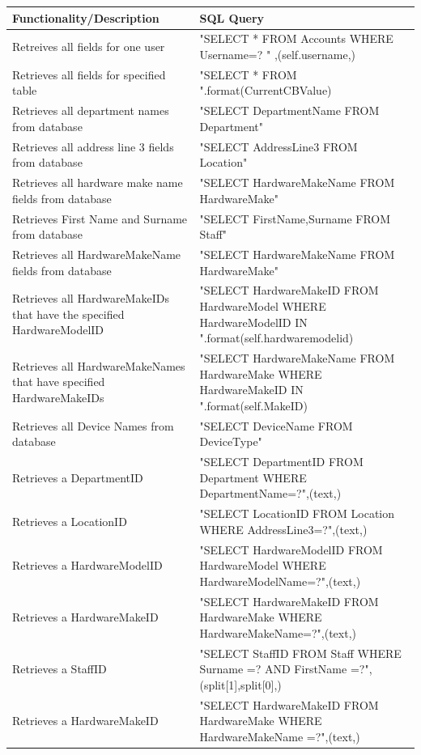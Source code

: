\begin{center}
    \begin{longtable}{|p{5cm}|p{7cm}|}
    \hline
	\textbf{Functionality/Description} & \textbf{SQL Query} \\ \hline

Retreives all fields for one user & "SELECT * FROM Accounts WHERE Username=? " ,(self.username,)\\ \hline
Retrieves all fields for specified table & "SELECT * FROM {}".format(CurrentCBValue) \\ \hline
Retrieves all department names from database & "SELECT DepartmentName FROM Department" \\ \hline
Retrieves all address line 3 fields from database & "SELECT AddressLine3 FROM Location" \\ \hline
Retrieves all hardware make name fields  from database & "SELECT HardwareMakeName FROM HardwareMake" \\ \hline
Retrieves First Name and Surname from database & "SELECT FirstName,Surname FROM Staff" \\ \hline
Retrieves all HardwareMakeName fields from database & "SELECT HardwareMakeName FROM HardwareMake"  \\ \hline
Retrieves all HardwareMakeIDs that have the specified HardwareModelID & "SELECT HardwareMakeID FROM HardwareModel WHERE HardwareModelID IN {}".format(self.hardwaremodelid) \\ \hline
Retrieves all HardwareMakeNames that have specified HardwareMakeIDs & "SELECT HardwareMakeName FROM HardwareMake WHERE HardwareMakeID IN {}".format(self.MakeID) \\ \hline
Retrieves all Device Names from database & "SELECT DeviceName FROM DeviceType" \\ \hline
Retrieves a DepartmentID & "SELECT DepartmentID FROM Department WHERE DepartmentName=?",(text,) \\ \hline
Retrieves a LocationID & "SELECT LocationID FROM Location WHERE AddressLine3=?",(text,) \\ \hline
Retrieves a HardwareModelID &"SELECT HardwareModelID FROM HardwareModel WHERE HardwareModelName=?",(text,) \\ \hline
Retrieves a HardwareMakeID & "SELECT HardwareMakeID FROM HardwareMake WHERE HardwareMakeName=?",(text,) \\ \hline
Retrieves a StaffID & "SELECT StaffID FROM Staff WHERE Surname =? AND FirstName =?",(split[1],split[0],) \\ \hline
Retrieves a HardwareMakeID & "SELECT HardwareMakeID FROM HardwareMake WHERE HardwareMakeName =?",(text,) \\ \hline

\end{longtable}
\end{center}
